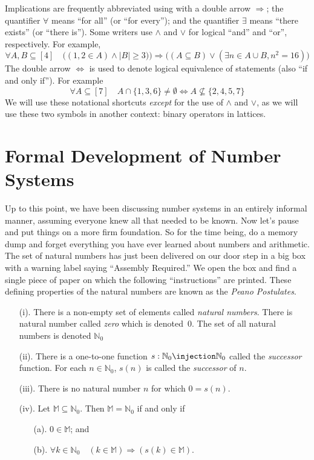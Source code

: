 Implications are frequently abbreviated using with
a double arrow $\Longrightarrow$; the quantifier $\forall$ means ``for all'' 
(or ``for every''); and the quantifier $\exists$ means 
``there exists'' (or ``there is'').  Some
writers use $\wedge$ and $\vee$ for logical ``and'' and
``or'', respectively.  For example, 
\[
\forall A,B\subseteq[4]\quad \bigl((1,2\in A) \wedge |B|\ge 3)\bigr)
\Longrightarrow\bigl((A\subseteq B)\vee (\exists n\in A\cup B, 
 n^2=16)\bigr)
\]
The double arrow $\iff$ is used to denote logical equivalence
of statements (also ``if and only if'').  For example
\[
\forall A\subseteq[7]\quad A\cap\{1,3,6\}\neq\emptyset\iff
A\nsubseteq\{2,4,5,7\}
\]
We will use these notational shortcuts \textit{except} for
the use of $\wedge$ and $\vee$, as we will use these two symbols
in another context: binary operators in lattices. 

\section{Formal Development of Number Systems}

Up to this point, we have been discussing number systems
in an entirely informal manner, assuming everyone knew
all that needed to be known.  Now let's pause and put
things on a more firm foundation.  So 
for the time being, do a memory dump and forget everything you have ever
learned about numbers and arithmetic. The set
of natural numbers has just been delivered on our
door step in a big box with a warning label saying ``Assembly
Required.''  We open the box and find a single piece of paper
on which the following ``instructions'' are printed.  These
defining properties of the natural numbers are known as the \textit{Peano 
Postulates}.

\begin{enumerate}
\item[(i).] There is a non-empty set of elements called 
\textit{natural numbers}.  There is natural number
called \textit{zero} which is denoted~$0$.  The set of all natural
numbers is denoted $\mathbb{N}_0$
\item[(ii).] There is a one-to-one function $s:\mathbb{N}_0
\injection \mathbb{N}_0$
called the \textit{successor} function.  For each $n\in \mathbb{N}_0$,
$s(n)$ is called the \textit{successor} of $n$.
\item[(iii).] There is no natural number $n$ for which $0=s(n)$.
\item[(iv).] Let $\mathbb{M}\subseteq \mathbb{N}_0$.  
Then $\mathbb{M} =\mathbb{N}_0$ if and only if
\begin{enumerate}
\item[(a).] $0\in \mathbb{M}$; and 
\item[(b).] $\forall k\in \mathbb{N}_0\quad(k\in \mathbb{M}) 
  \Longrightarrow(s(k)\in \mathbb{M})$. 
\end{enumerate}
\end{enumerate}

